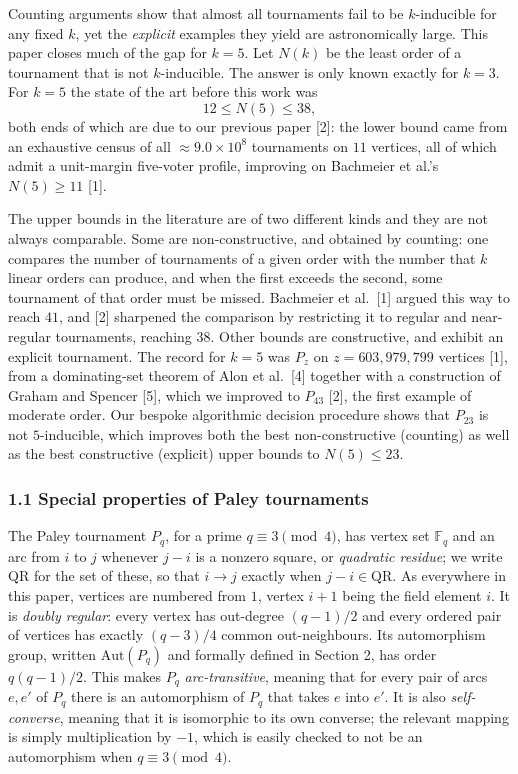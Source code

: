 \documentclass[
]{article}
\begin{document}
Counting arguments show that almost all tournaments fail to be
\(k\)-inducible for any fixed \(k\), yet the \emph{explicit} examples
they yield are astronomically large. This paper closes much of the gap
for \(k = 5\). Let \(N(k)\) be the least order of a tournament that is
not \(k\)-inducible. The answer is only known exactly for \(k = 3\). For
\(k = 5\) the state of the art before this work was
\[12 \le N(5) \le 38,\] both ends of which are due to our previous paper
{[}2{]}: the lower bound came from an exhaustive census of all
\(\approx 9.0 \times 10^{8}\) tournaments on \(11\) vertices, all of
which admit a unit-margin five-voter profile, improving on Bachmeier et
al.'s \(N(5) \ge 11\) {[}1{]}.

The upper bounds in the literature are of two different kinds and they
are not always comparable. Some are non-constructive, and obtained by
counting: one compares the number of tournaments of a given order with
the number that \(k\) linear orders can produce, and when the first
exceeds the second, some tournament of that order must be missed.
Bachmeier et al.~{[}1{]} argued this way to reach \(41\), and {[}2{]}
sharpened the comparison by restricting it to regular and near-regular
tournaments, reaching \(38\). Other bounds are constructive, and exhibit
an explicit tournament. The record for \(k = 5\) was \(P_{z}\) on
\(z = 603{,}979{,}799\) vertices {[}1{]}, from a dominating-set theorem
of Alon et al.~{[}4{]} together with a construction of Graham and
Spencer {[}5{]}, which we improved to \(P_{43}\) {[}2{]}, the first
example of moderate order. Our bespoke algorithmic decision procedure
shows that \(P_{23}\) is not \(5\)-inducible, which improves both the
best non-constructive (counting) as well as the best constructive
(explicit) upper bounds to \(N(5) \le 23\).

\subsubsection{1.1 Special properties of Paley
tournaments}\label{special-properties-of-paley-tournaments}

The Paley tournament \(P_q\), for a prime \(q \equiv 3 \pmod 4\), has
vertex set \(\mathbb{F}_q\) and an arc from \(i\) to \(j\) whenever
\(j - i\) is a nonzero square, or \emph{quadratic residue}; we write
\(\mathrm{QR}\) for the set of these, so that \(i \to j\) exactly when
\(j - i \in
\mathrm{QR}\). As everywhere in this paper, vertices are numbered from
\(1\), vertex \(i + 1\) being the field element \(i\). It is
\emph{doubly regular}: every vertex has out-degree \((q-1)/2\) and every
ordered pair of vertices has exactly \((q-3)/4\) common out-neighbours.
Its automorphism group, written \(\mathrm{Aut}(P_q)\) and formally
defined in Section 2, has order \(q(q-1)/2\). This makes \(P_q\)
\emph{arc-transitive}, meaning that for every pair of arcs \(e, e'\) of
\(P_q\) there is an automorphism of \(P_q\) that takes \(e\) into
\(e'\). It is also \emph{self-converse}, meaning that it is isomorphic
to its own converse; the relevant mapping is simply multiplication by
\(-1\), which is easily checked to not be an automorphism when
\(q \equiv 3 \pmod 4\).
\end{document}
